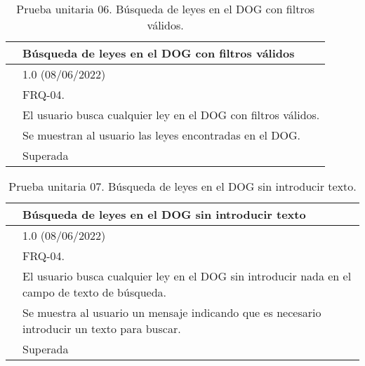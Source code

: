 \begin{table}[H]
\begin{center}
\begin{tabular}{|p{3cm}|p{10cm}|} \hline
\centering {\bf PU-06} & Búsqueda de leyes en el DOG con filtros válidos  \\ \hline\hline
\centering {\bf Versión} & 1.0 (08/06/2022) \\ \hline
\centering {\bf Dependencias} & FRQ-04. \\ \hline
\centering {\bf Descripción} &  El usuario busca cualquier ley en el DOG con filtros válidos. \\ \hline
\centering {\bf Criterio de aceptación} & Se muestran al usuario las leyes encontradas en el DOG. \\ \hline
\centering {\bf Estado} & Superada \\ \hline
\end{tabular}
\caption{Prueba unitaria 06. Búsqueda de leyes en el DOG con filtros válidos.}
\label{enlacePU6}
\end{center}
\end{table}

\begin{table}[H]
\begin{center}
\begin{tabular}{|p{3cm}|p{10cm}|} \hline
\centering {\bf PU-07} & Búsqueda de leyes en el DOG sin introducir texto  \\ \hline\hline
\centering {\bf Versión} & 1.0 (08/06/2022) \\ \hline
\centering {\bf Dependencias} & FRQ-04. \\ \hline
\centering {\bf Descripción} &  El usuario busca cualquier ley en el DOG sin introducir nada en el campo de texto de búsqueda. \\ \hline
\centering {\bf Criterio de aceptación} & Se muestra al usuario un mensaje indicando que es necesario introducir un texto para buscar. \\ \hline
\centering {\bf Estado} & Superada \\ \hline
\end{tabular}
\caption{Prueba unitaria 07. Búsqueda de leyes en el DOG sin introducir texto.}
\label{enlacePU7}
\end{center}
\end{table}

